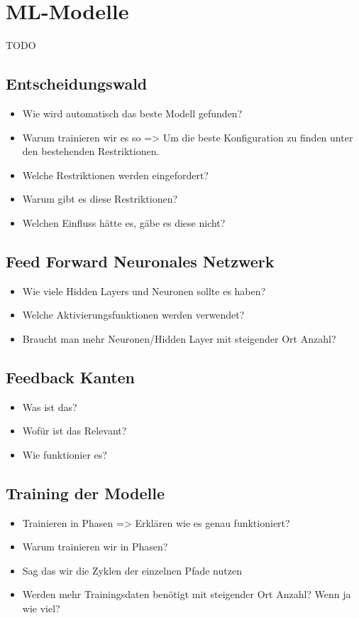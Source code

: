 \chapter{ML-Modelle}
TODO

\section{Entscheidungswald}
\begin{itemize}
    \item Wie wird automatisch das beste Modell gefunden?
    \item Warum trainieren wir es so => Um die beste Konfiguration zu finden unter den bestehenden Restriktionen.
    \item Welche Restriktionen werden eingefordert?
    \item Warum gibt es diese Restriktionen?
    \item Welchen Einfluss hätte es, gäbe es diese nicht?
\end{itemize}

\section{Feed Forward Neuronales Netzwerk}
\begin{itemize}
    \item Wie viele Hidden Layers und Neuronen sollte es haben?
    \item Welche Aktivierungsfunktionen werden verwendet?
    \item Braucht man mehr Neuronen/Hidden Layer mit steigender Ort Anzahl?
\end{itemize}

\section{Feedback Kanten}
\begin{itemize}
    \item Was ist das?
    \item Wofür ist das Relevant?
    \item Wie funktionier es?
\end{itemize}

\section{Training der Modelle}
\begin{itemize}
    \item Trainieren in Phasen => Erklären wie es genau funktioniert?
    \item Warum trainieren wir in Phasen?
    \item Sag das wir die Zyklen der einzelnen Pfade nutzen
    \item Werden mehr Trainingsdaten benötigt mit steigender Ort Anzahl? Wenn ja wie viel?
\end{itemize}

